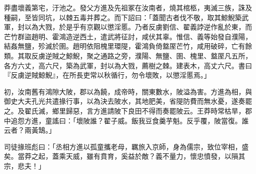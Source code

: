 \begin{pinyinscope}
莽盡壞義第宅，汙池之。發父方進及先祖冢在汝南者，燒其棺柩，夷滅三族，誅及種嗣，至皆同坑，以棘五毒并葬之。而下詔曰：「蓋聞古者伐不敬，取其鯨鯢築武軍，封以為大戮，於是乎有京觀以懲淫慝。乃者反虜劉信、翟義誖逆作亂於東，而芒竹群盜趙明、霍鴻造逆西土，遣武將征討，咸伏其辜。惟信、義等始發自濮陽，結姦無鹽，殄滅於圉。趙明依阻槐里環隄，霍鴻負倚盩厔芒竹，咸用破碎，亡有餘類。其取反虜逆賊之鯨鯢，聚之通路之旁，濮陽、無鹽、圉、槐里、盩厔凡五所，各方六丈，高六尺，築為武軍，封以為大戮，薦樹之棘。建表木，高丈六尺。書曰『反虜逆賊鯨鯢』，在所長吏常以秋循行，勿令壞敗，以懲淫慝焉。」

初，汝南舊有鴻隙大陂，郡以為饒，成帝時，關東數水，陂溢為害。方進為相，與御史大夫孔光共遣掾行事，以為決去陂水，其地肥美，省隄防費而無水憂，遂奏罷之。及翟氏滅，鄉里歸惡，言方進請陂下良田不得而奏罷陂云。王莽時常枯旱，郡中追怨方進，童謠曰：「壞陂誰？翟子威。飯我豆食羹芋魁。反乎覆，陂當復。誰云者？兩黃鵠。」

司徒掾班彪曰：「丞相方進以孤童攜老母，羈旅入京師，身為儒宗，致位宰相，盛矣。當莽之起，蓋乘天威，雖有賁育，奚益於敵？義不量力，懷忠憤發，以隕其宗，悲夫！」


\end{pinyinscope}